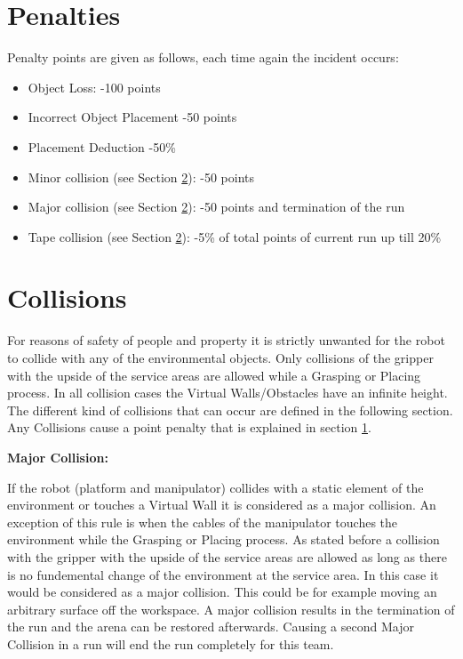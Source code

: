 \section{Penalties}
\label{sec:penalties}
Penalty points are given as follows, each time again the incident occurs:

\begin{itemize}
	\item Object Loss: \hfill -100 points
	\item Incorrect Object Placement \hfill -50 points
	\item Placement Deduction \hfill -50\%
	\item Minor collision (see Section \ref{sec:Collisions}): \hfill -50 points
	\item Major collision (see Section \ref{sec:Collisions}): \hfill -50 points and termination of the run
  \item Tape collision (see Section \ref{sec:Collisions}): \hfill -5\% of total points of current run up till
  20\%
\end{itemize}


\section{Collisions}\label{sec:Collisions}

For reasons of safety of people and property it is strictly unwanted for the robot to collide
with any of the environmental objects. Only collisions of the gripper with the upside of
the service areas are allowed while a Grasping or Placing process. In all collision cases the Virtual Walls/Obstacles have an infinite height. The different kind of collisions that can occur are defined in the
following section. Any Collisions cause a point penalty that is explained in section \ref{sec:penalties}.  

\textbf{Major Collision:}

If the robot (platform and manipulator) collides with a static element of the environment or touches a Virtual Wall it is considered as a major collision. An exception of this rule is when the cables of the manipulator touches the environment while the Grasping or Placing process. As stated before a collision with the  gripper with the upside of the service areas are allowed as long as there is no fundemental change of the environment at the service area. In this case it would be considered as a major collision. This could be for example moving an arbitrary surface off the workspace. A major collision results in the termination of the run and the arena can be restored afterwards. Causing a second Major Collision in a run will end the run completely for this team.


